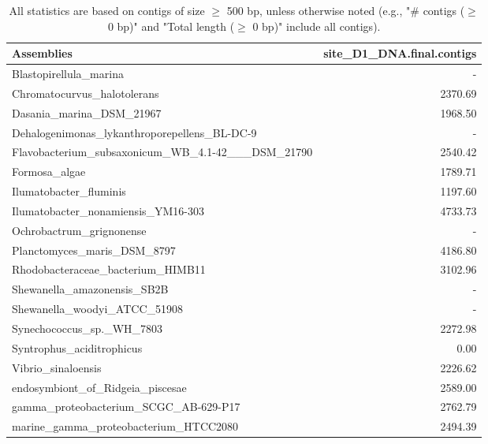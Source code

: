\documentclass[12pt,a4paper]{article}
\begin{document}
\begin{table}[ht]
\begin{center}
\caption{All statistics are based on contigs of size $\geq$ 500 bp, unless otherwise noted (e.g., "\# contigs ($\geq$ 0 bp)" and "Total length ($\geq$ 0 bp)" include all contigs).}
\begin{tabular}{|l*{1}{|r}|}
\hline
Assemblies & site\_D1\_DNA.final.contigs \\ \hline
Blastopirellula\_marina & - \\ \hline
Chromatocurvus\_halotolerans & 2370.69 \\ \hline
Dasania\_marina\_DSM\_21967 & 1968.50 \\ \hline
Dehalogenimonas\_lykanthroporepellens\_BL-DC-9 & - \\ \hline
Flavobacterium\_subsaxonicum\_WB\_4.1-42\_\_\_DSM\_21790 & 2540.42 \\ \hline
Formosa\_algae & 1789.71 \\ \hline
Ilumatobacter\_fluminis & 1197.60 \\ \hline
Ilumatobacter\_nonamiensis\_YM16-303 & 4733.73 \\ \hline
Ochrobactrum\_grignonense & - \\ \hline
Planctomyces\_maris\_DSM\_8797 & 4186.80 \\ \hline
Rhodobacteraceae\_bacterium\_HIMB11 & 3102.96 \\ \hline
Shewanella\_amazonensis\_SB2B & - \\ \hline
Shewanella\_woodyi\_ATCC\_51908 & - \\ \hline
Synechococcus\_sp.\_WH\_7803 & 2272.98 \\ \hline
Syntrophus\_aciditrophicus & 0.00 \\ \hline
Vibrio\_sinaloensis & 2226.62 \\ \hline
endosymbiont\_of\_Ridgeia\_piscesae & 2589.00 \\ \hline
gamma\_proteobacterium\_SCGC\_AB-629-P17 & 2762.79 \\ \hline
marine\_gamma\_proteobacterium\_HTCC2080 & 2494.39 \\ \hline
\end{tabular}
\end{center}
\end{table}
\end{document}

